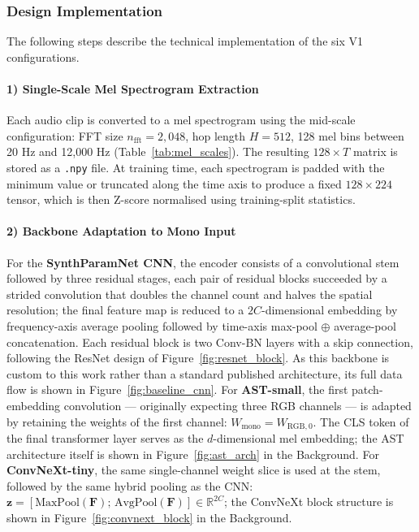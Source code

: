 \subsubsection{Design Implementation}

\noindent
The following steps describe the technical implementation of the six V1 configurations.

\paragraph{1) Single-Scale Mel Spectrogram Extraction}
Each audio clip is converted to a mel spectrogram using the mid-scale configuration: FFT size $n_{\text{fft}}=2{,}048$, hop length $H=512$, 128 mel bins between 20 Hz and 12{,}000 Hz (Table~\ref{tab:mel_scales}). The resulting $128 \times T$ matrix is stored as a \texttt{.npy} file. At training time, each spectrogram is padded with the minimum value or truncated along the time axis to produce a fixed $128 \times 224$ tensor, which is then Z-score normalised using training-split statistics.

\paragraph{2) Backbone Adaptation to Mono Input}
For the \textbf{SynthParamNet CNN}, the encoder consists of a convolutional stem followed by three residual stages, each pair of residual blocks succeeded by a strided convolution that doubles the channel count and halves the spatial resolution; the final feature map is reduced to a $2C$-dimensional embedding by frequency-axis average pooling followed by time-axis max-pool $\oplus$ average-pool concatenation. Each residual block is two Conv-BN layers with a skip connection, following the ResNet design of Figure~\ref{fig:resnet_block}. As this backbone is custom to this work rather than a standard published architecture, its full data flow is shown in Figure~\ref{fig:baseline_cnn}. For \textbf{AST-small}, the first patch-embedding convolution — originally expecting three RGB channels — is adapted by retaining the weights of the first channel: $W_{\text{mono}} = W_{\text{RGB},0}$. The CLS token of the final transformer layer serves as the $d$-dimensional mel embedding; the AST architecture itself is shown in Figure~\ref{fig:ast_arch} in the Background. For \textbf{ConvNeXt-tiny}, the same single-channel weight slice is used at the stem, followed by the same hybrid pooling as the CNN: $\mathbf{z} = [\text{MaxPool}(\mathbf{F});\, \text{AvgPool}(\mathbf{F})] \in \mathbb{R}^{2C}$; the ConvNeXt block structure is shown in Figure~\ref{fig:convnext_block} in the Background.

